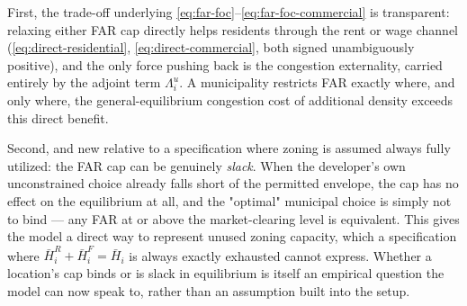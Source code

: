 \documentclass[12pt,a4paper]{article}
\newcommand{\1}{\mathbb 1}
\begin{document}
First, the trade-off underlying \eqref{eq:far-foc}--\eqref{eq:far-foc-commercial} is transparent: relaxing either FAR cap directly helps residents through the rent or wage channel (\eqref{eq:direct-residential}, \eqref{eq:direct-commercial}, both signed unambiguously positive), and the only force pushing back is the congestion externality, carried entirely by the adjoint term $\Lambda_i^u$. A municipality restricts FAR exactly where, and only where, the general-equilibrium congestion cost of additional density exceeds this direct benefit.

Second, and new relative to a specification where zoning is assumed always fully utilized: the FAR cap can be genuinely \emph{slack}. When the developer's own unconstrained choice already falls short of the permitted envelope, the cap has no effect on the equilibrium at all, and the "optimal" municipal choice is simply not to bind — any FAR at or above the market-clearing level is equivalent. This gives the model a direct way to represent unused zoning capacity, which a specification where $\bar H_i^R+\bar H_i^F=\bar H_i$ is always exactly exhausted cannot express. Whether a location's cap binds or is slack in equilibrium is itself an empirical question the model can now speak to, rather than an assumption built into the setup.
\end{document}

